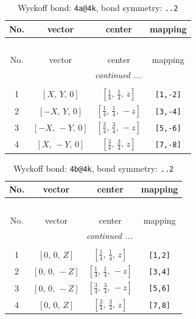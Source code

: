 \documentclass[fleqn,8pt]{jsarticle}
\begin{document}
\begin{longtable}{cccc}
\caption{Wyckoff bond: {\tt 4a@4k}, bond symmetry: {\tt ..2}}
 \\
 \hline \hline
No. & vector & center & mapping \\ \hline \endfirsthead

\multicolumn{3}{l}{\tablename\ \thetable{}} \\
 \hline \hline
No. & vector & center & mapping \\ \hline \endhead

 \hline \hline
\multicolumn{3}{r}{\footnotesize\it continued ...} \\ \endfoot

 \hline \hline
\multicolumn{3}{r}{} \\ \endlastfoot

1 & $\left[ X,\, Y,\, 0 \right]$ & $\left[ \frac{1}{4},\, \frac{1}{4},\, z \right]$ & {\tt [1,-2]} \\ \hline
2 & $\left[ - X,\, Y,\, 0 \right]$ & $\left[ \frac{1}{4},\, \frac{1}{4},\, - z \right]$ & {\tt [3,-4]} \\ \hline
3 & $\left[ - X,\, - Y,\, 0 \right]$ & $\left[ \frac{3}{4},\, \frac{3}{4},\, - z \right]$ & {\tt [5,-6]} \\ \hline
4 & $\left[ X,\, - Y,\, 0 \right]$ & $\left[ \frac{3}{4},\, \frac{3}{4},\, z \right]$ & {\tt [7,-8]} \\
\end{longtable}
\renewcommand{\arraystretch}{1.2}
\begin{longtable}{cccc}
\caption{Wyckoff bond: {\tt 4b@4k}, bond symmetry: {\tt ..2}}
 \\
 \hline \hline
No. & vector & center & mapping \\ \hline \endfirsthead

\multicolumn{3}{l}{\tablename\ \thetable{}} \\
 \hline \hline
No. & vector & center & mapping \\ \hline \endhead

 \hline \hline
\multicolumn{3}{r}{\footnotesize\it continued ...} \\ \endfoot

 \hline \hline
\multicolumn{3}{r}{} \\ \endlastfoot

1 & $\left[ 0,\, 0,\, Z \right]$ & $\left[ \frac{1}{4},\, \frac{1}{4},\, z \right]$ & {\tt [1,2]} \\ \hline
2 & $\left[ 0,\, 0,\, - Z \right]$ & $\left[ \frac{1}{4},\, \frac{1}{4},\, - z \right]$ & {\tt [3,4]} \\ \hline
3 & $\left[ 0,\, 0,\, - Z \right]$ & $\left[ \frac{3}{4},\, \frac{3}{4},\, - z \right]$ & {\tt [5,6]} \\ \hline
4 & $\left[ 0,\, 0,\, Z \right]$ & $\left[ \frac{3}{4},\, \frac{3}{4},\, z \right]$ & {\tt [7,8]} \\
\end{longtable}
\end{document}
